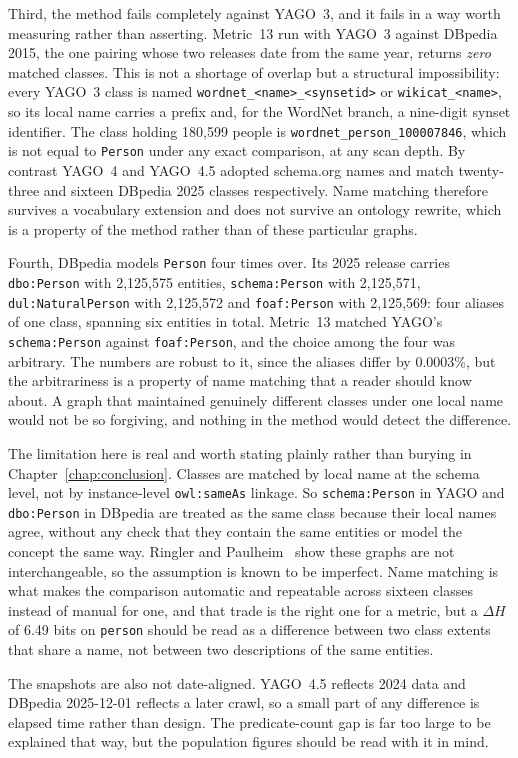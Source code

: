 Third, the method fails completely against YAGO~3, and it fails in a way worth
measuring rather than asserting. Metric~13 run with YAGO~3 against DBpedia
2015, the one pairing whose two releases date from the same year, returns
\emph{zero} matched classes. This is not a
shortage of overlap but a structural impossibility: every YAGO~3 class is named
\texttt{wordnet\_<name>\_<synsetid>} or \texttt{wikicat\_<name>}, so its local
name carries a prefix and, for the WordNet branch, a nine-digit synset
identifier. The class holding 180{,}599 people is
\texttt{wordnet\_person\_100007846}, which is not equal to \texttt{Person} under
any exact comparison, at any scan depth. By contrast YAGO~4 and YAGO~4.5 adopted
schema.org names and match twenty-three and sixteen DBpedia 2025 classes
respectively. Name matching therefore survives a vocabulary extension and does
not survive an ontology rewrite, which is a property of the method rather than
of these particular graphs.

Fourth, DBpedia models \texttt{Person} four times over. Its 2025 release carries
\texttt{dbo:Person} with 2{,}125{,}575 entities, \texttt{schema:Person} with
2{,}125{,}571, \texttt{dul:NaturalPerson} with 2{,}125{,}572 and
\texttt{foaf:Person} with 2{,}125{,}569: four aliases of one class, spanning six
entities in total. Metric~13 matched YAGO's \texttt{schema:Person} against
\texttt{foaf:Person}, and the choice among the four was arbitrary. The numbers
are robust to it, since the aliases differ by 0.0003\%, but the arbitrariness is
a property of name matching that a reader should know about. A graph that
maintained genuinely different classes under one local name would not be so
forgiving, and nothing in the method would detect the difference.

The limitation here is real and worth stating plainly rather than burying in
Chapter~\ref{chap:conclusion}. Classes are matched by local name at the schema
level, not by instance-level \texttt{owl:sameAs} linkage. So
\texttt{schema:Person} in YAGO and \texttt{dbo:Person} in DBpedia are treated as
the same class because their local names agree, without any check that they
contain the same entities or model the concept the same way. Ringler and
Paulheim~\cite{ringler2017one} show these graphs are not interchangeable, so the
assumption is known to be imperfect. Name matching is what makes the comparison
automatic and repeatable across sixteen classes instead of manual for one, and that
trade is the right one for a metric, but a $\Delta H$ of 6.49 bits on
\texttt{person} should be read as a difference between two class extents that
share a name, not between two descriptions of the same entities.

The snapshots are also not date-aligned. YAGO~4.5 reflects 2024 data and DBpedia
2025-12-01 reflects a later crawl, so a small part of any difference is elapsed
time rather than design. The predicate-count gap is far too large to be explained
that way, but the population figures should be read with it in mind.
